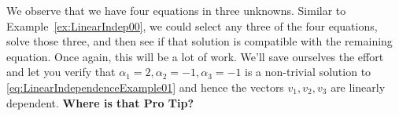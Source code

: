 We observe that we have four equations in three unknowns. Similar to Example~\ref{ex:LinearIndep00}, we could select any three of the four equations, solve those three, and then see if that solution is compatible with the remaining equation. Once again, this will be a lot of work. We'll save ourselves the effort and let you verify that $\alpha_1=2, \alpha_2=-1, \alpha_3 = -1$ is a non-trivial solution to \eqref{eq:LinearIndependenceExample01} and hence the vectors $v_1, v_2, v_3$ are linearly dependent. \textbf{Where is that Pro Tip?} \Qed\\




